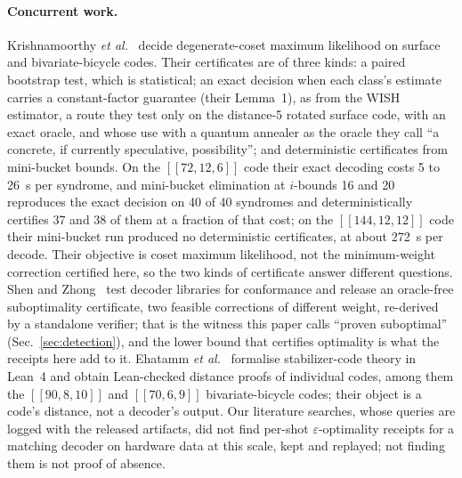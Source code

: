 \documentclass[aps,pra,twocolumn,superscriptaddress,nofootinbib,longbibliography,floatfix]{revtex4-2}
\newcommand{\eps}{\varepsilon}
\begin{document}
\paragraph*{Concurrent work.} Krishnamoorthy \textit{et al.}~\cite{krishnamoorthy2026certified} decide degenerate-coset maximum likelihood on surface and bivariate-bicycle codes. Their certificates are of three kinds: a paired bootstrap test, which is statistical; an exact decision when each class's estimate carries a constant-factor guarantee (their Lemma~1), as from the WISH estimator, a route they test only on the distance-5 rotated surface code, with an exact oracle, and whose use with a quantum annealer as the oracle they call ``a concrete, if currently speculative, possibility''; and deterministic certificates from mini-bucket bounds. On the $[[72,12,6]]$ code their exact decoding costs 5 to 26~s per syndrome, and mini-bucket elimination at $i$-bounds 16 and 20 reproduces the exact decision on 40 of 40 syndromes and deterministically certifies 37 and 38 of them at a fraction of that cost; on the $[[144,12,12]]$ code their mini-bucket run produced no deterministic certificates, at about 272~s per decode. Their objective is coset maximum likelihood, not the minimum-weight correction certified here, so the two kinds of certificate answer different questions. Shen and Zhong~\cite{shen2026capability} test decoder libraries for conformance and release an oracle-free suboptimality certificate, two feasible corrections of different weight, re-derived by a standalone verifier; that is the witness this paper calls ``proven suboptimal'' (Sec.~\ref{sec:detection}), and the lower bound that certifies optimality is what the receipts here add to it. Ehatamm \textit{et al.}~\cite{ehatamm2026end} formalise stabilizer-code theory in Lean~4 and obtain Lean-checked distance proofs of individual codes, among them the $[[90,8,10]]$ and $[[70,6,9]]$ bivariate-bicycle codes; their object is a code's distance, not a decoder's output. Our literature searches, whose queries are logged with the released artifacts, did not find per-shot $\eps$-optimality receipts for a matching decoder on hardware data at this scale, kept and replayed; not finding them is not proof of absence.
\end{document}
